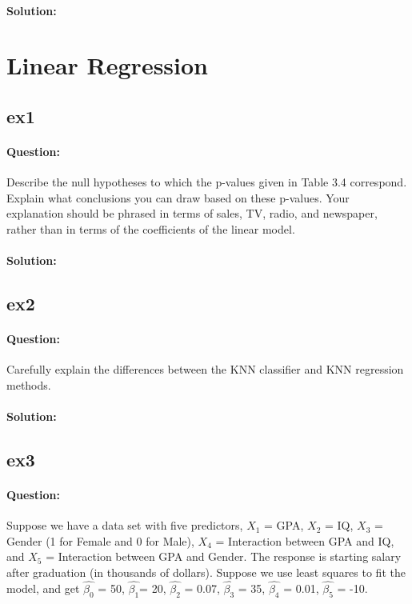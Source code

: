 \documentclass[a4paper,12pt,titlepage]{article} %
\begin{document}
\paragraph{Solution:}


\newpage
\section{Linear Regression}
\subsection{ex1}
\paragraph{Question:} Describe the null hypotheses to which the p-values given in Table 3.4 correspond. Explain what conclusions you can draw based on these p-values. Your explanation should be phrased in terms of sales, TV, radio, and newspaper, rather than in terms of the coefficients of the
linear model.

\paragraph{Solution:}

\subsection{ex2}
\paragraph{Question:} Carefully explain the differences between the KNN classifier and KNN
regression methods.

\paragraph{Solution:}

\subsection{ex3}
\paragraph{Question:} Suppose we have a data set with five predictors, $X_{1}$ = GPA, $X_{2}$ = IQ, $X_{3}$ = Gender (1 for Female and 0 for Male), $X_{4}$ = Interaction between GPA and IQ, and $X_{5}$ = Interaction between GPA and Gender. The response is starting salary after graduation (in thousands of dollars). Suppose we use least squares to fit the model, and get $\hat{\beta_{0}}$ = 50, $\hat{\beta_{1}}$= 20, $\hat{\beta_{2}}$ = 0.07, $\hat{\beta_{3}}$ = 35, $\hat{\beta_{4}}$ = 0.01, $\hat{\beta_{5}}$ = -10.
\end{document}
